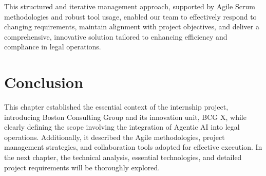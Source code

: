 This structured and iterative management approach, supported by Agile Scrum methodologies and robust tool usage, enabled our team to effectively respond to changing requirements, maintain alignment with project objectives, and deliver a comprehensive, innovative solution tailored to enhancing efficiency and compliance in legal operations.


\section{Conclusion}
This chapter established the essential context of the internship project, introducing Boston Consulting Group and its innovation unit, BCG X, while clearly defining the scope involving the integration of Agentic AI into legal operations. Additionally, it described the Agile methodologies, project management strategies, and collaboration tools adopted for effective execution. In the next chapter, the technical analysis, essential technologies, and detailed project requirements will be thoroughly explored.
